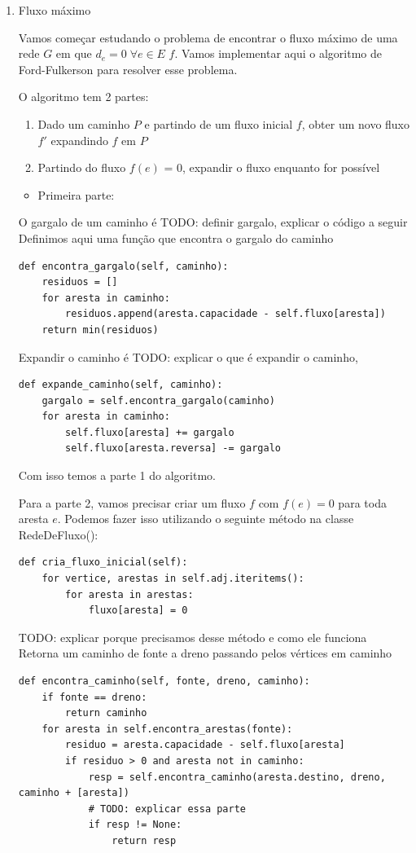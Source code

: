 \documentclass[11pt]{article}
\begin{document}
\begin{enumerate}
\item Fluxo máximo
\label{sec-3-3-3-1}

Vamos começar estudando o problema de encontrar o fluxo máximo de uma
rede $G$ em que $d_e = 0 \; \forall e \in E$ $f$. Vamos implementar aqui o
algoritmo de Ford-Fulkerson para resolver esse problema.

O algoritmo tem 2 partes:

\begin{enumerate}
\item Dado um caminho $P$ e partindo de um fluxo inicial $f$, obter um
novo fluxo $f'$ expandindo $f$ em $P$
\item Partindo do fluxo $f(e)$ = 0, expandir o fluxo enquanto for possível
\end{enumerate}


\begin{itemize}
\item Primeira parte:
\end{itemize}

O gargalo de um caminho é TODO: definir gargalo, explicar o código a seguir
Definimos aqui uma função que encontra o gargalo do caminho
\begin{verbatim}
def encontra_gargalo(self, caminho):
    residuos = []
    for aresta in caminho:
        residuos.append(aresta.capacidade - self.fluxo[aresta])
    return min(residuos)
\end{verbatim}

Expandir o caminho é TODO: explicar o que é expandir o caminho,

\begin{verbatim}
def expande_caminho(self, caminho):
    gargalo = self.encontra_gargalo(caminho)
    for aresta in caminho:
        self.fluxo[aresta] += gargalo
        self.fluxo[aresta.reversa] -= gargalo
\end{verbatim}

Com isso temos a parte 1 do algoritmo.

Para a parte 2, vamos precisar criar um fluxo $f$ com $f(e) = 0$ para
toda aresta $e$. Podemos fazer isso utilizando o seguinte método na
classe RedeDeFluxo():
\begin{verbatim}
def cria_fluxo_inicial(self):
    for vertice, arestas in self.adj.iteritems():
        for aresta in arestas:
            fluxo[aresta] = 0
\end{verbatim}

TODO: explicar porque precisamos desse método e como ele funciona
Retorna um caminho de fonte a dreno passando pelos vértices
em caminho
\begin{verbatim}
def encontra_caminho(self, fonte, dreno, caminho):
    if fonte == dreno:
        return caminho
    for aresta in self.encontra_arestas(fonte):
        residuo = aresta.capacidade - self.fluxo[aresta]
        if residuo > 0 and aresta not in caminho:
            resp = self.encontra_caminho(aresta.destino, dreno, caminho + [aresta])
            # TODO: explicar essa parte
            if resp != None:
                return resp
\end{verbatim}


\end{enumerate}
\end{document}
